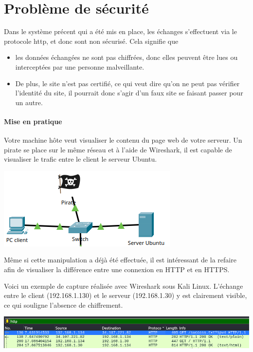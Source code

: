 \documentclass[french, 12pt]{article}%
\newcommand{\itemE}{\item[$\bullet$]}
\begin{document}
\tableofcontents
\newpage


\section{Problème de sécurité}
Dans le système précent qui a été mis en place, les échanges s'effectuent via le protocole http, et donc sont non sécurisé. Cela signifie que
\begin{itemize}
\itemE les données échangées ne sont pas chiffrées, donc elles peuvent être lues ou interceptées par une personne malveillante. 
\itemE De plus, le site n’est pas certifié, ce qui veut dire qu'on ne peut pas vérifier l'identité du site, il pourrait donc s'agir d'un faux site se faisant passer pour un autre.
\end{itemize} 

\paragraph{Mise en pratique}

Votre machine hôte veut visualiser le contenu du page web de votre serveur.  Un pirate se place sur le même réseau et à l'aide de Wireshark, il est capable de visualiser le trafic entre le client le serveur Ubuntu.
\begin{center}
\includegraphics[scale=0.7]{./ressource/topReseau.png}
\end{center}

Même si cette manipulation a déjà été effectuée, il est intéressant de la refaire afin de visualiser la différence entre une connexion en HTTP et en HTTPS.

Voici un exemple de capture réalisée avec Wireshark sous Kali Linux. L’échange entre le client (192.168.1.130) et le serveur (192.168.1.30) y est clairement visible, ce qui souligne l'absence de chiffrement. 
\begin{center}
\includegraphics[scale=0.5]{./ressource/captureWireshark}
\end{center}
\end{document}

